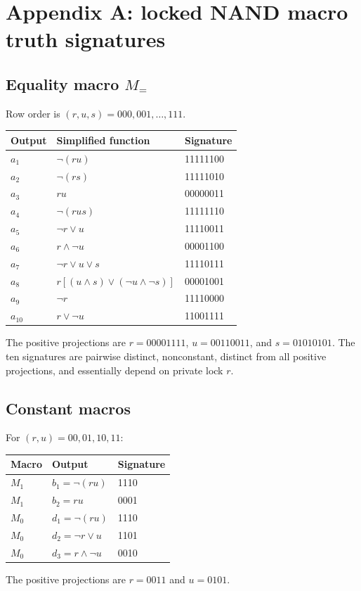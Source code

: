 \documentclass[10.5pt,a4paper]{article}
\begin{document}
\section{Appendix A: locked NAND macro truth signatures}

\subsection{Equality macro \(M_=\)}
Row order is \((r,u,s)=000,001,\ldots,111\).
\begin{longtable}{lll}
\toprule
Output & Simplified function & Signature\\
\midrule
\(a_1\) & \(\neg(ru)\) & 11111100\\
\(a_2\) & \(\neg(rs)\) & 11111010\\
\(a_3\) & \(ru\) & 00000011\\
\(a_4\) & \(\neg(rus)\) & 11111110\\
\(a_5\) & \(\neg r\vee u\) & 11110011\\
\(a_6\) & \(r\wedge\neg u\) & 00001100\\
\(a_7\) & \(\neg r\vee u\vee s\) & 11110111\\
\(a_8\) & \(r[(u\wedge s)\vee(\neg u\wedge\neg s)]\) & 00001001\\
\(a_9\) & \(\neg r\) & 11110000\\
\(a_{10}\) & \(r\vee\neg u\) & 11001111\\
\bottomrule
\end{longtable}
The positive projections are \(r=00001111\), \(u=00110011\), and \(s=01010101\). The ten signatures are pairwise distinct, nonconstant, distinct from all positive projections, and essentially depend on private lock \(r\).

\subsection{Constant macros}
For \((r,u)=00,01,10,11\):
\begin{longtable}{lll}
\toprule
Macro & Output & Signature\\
\midrule
\(M_1\) & \(b_1=\neg(ru)\) & 1110\\
\(M_1\) & \(b_2=ru\) & 0001\\
\(M_0\) & \(d_1=\neg(ru)\) & 1110\\
\(M_0\) & \(d_2=\neg r\vee u\) & 1101\\
\(M_0\) & \(d_3=r\wedge\neg u\) & 0010\\
\bottomrule
\end{longtable}
The positive projections are \(r=0011\) and \(u=0101\).
\end{document}
